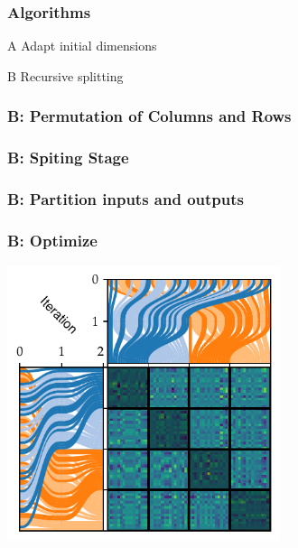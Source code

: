 \documentclass{beamer}
\begin{document}
\begin{frame}
\end{frame}

\begin{frame}
	\frametitle{Algorithms}
	\begin{exampleblock}{A}
		Adapt initial dimensions
	\end{exampleblock}
	\begin{exampleblock}{B}
		Recursive splitting
	\end{exampleblock}
\end{frame}

\begin{frame}
	\frametitle{B: Permutation of Columns and Rows}
	\centering
	\scalebox{0.8}{}
\end{frame}

\begin{frame}
	\frametitle{B: Spiting Stage}
	\scalebox{0.8}{}
\end{frame}

\begin{frame}
	\frametitle{B: Partition inputs and outputs}
	
\end{frame}

\begin{frame}
	\frametitle{B: Optimize}
	\centering
	\includegraphics[width=0.6\textwidth]{../Thesis/Plots/example_permute.pdf}
\end{frame}
\end{document}

